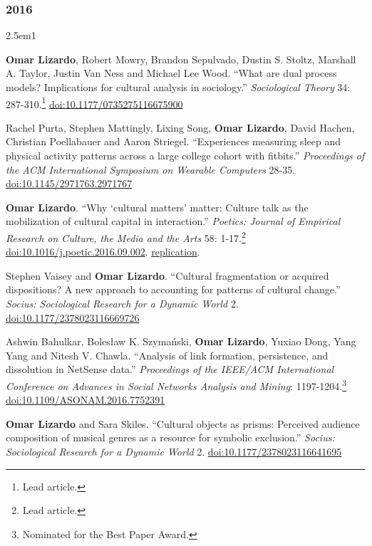 \documentclass[
]{article}
\newenvironment{cventry}{\begin{hangparas}{2.5em}{1}}{\end{hangparas}}
\begin{document}
\subsubsection{2016}\label{section-6}

\begin{cventry}

\textbf{Omar Lizardo}, Robert Mowry, Brandon Sepulvado, Dustin S.
Stoltz, Marshall A. Taylor, Justin Van Ness and Michael Lee Wood. ``What
are dual process models? Implications for cultural analysis in
sociology.'' \emph{Sociological Theory} 34: 287-310.\footnote{Lead
  article.}
\href{https://doi.org/10.1177/0735275116675900}{doi:10.1177/0735275116675900}

Rachel Purta, Stephen Mattingly, Lixing Song, \textbf{Omar Lizardo},
David Hachen, Christian Poellabauer and Aaron Striegel. ``Experiences
measuring sleep and physical activity patterns across a large college
cohort with fitbits.'' \emph{Proceedings of the ACM International
Symposium on Wearable Computers} 28-35.
\href{https://doi.org/10.1145/2971763.2971767}{doi:10.1145/2971763.2971767}

\textbf{Omar Lizardo}. ``Why `cultural matters' matter: Culture talk as
the mobilization of cultural capital in interaction.'' \emph{Poetics:
Journal of Empirical Research on Culture, the Media and the Arts} 58:
1-17.\footnote{Lead article.}
\href{https://doi.org/10.1016/j.poetic.2016.09.002}{doi:10.1016/j.poetic.2016.09.002}.
\href{https://github.com/olizardo/lizardo-culture-talk-stratification}{
replication}.

Stephen Vaisey and \textbf{Omar Lizardo}. ``Cultural fragmentation or
acquired dispositions? A new approach to accounting for patterns of
cultural change.'' \emph{Socius: Sociological Research for a Dynamic
World} 2.
\href{https://doi.org/10.1177/2378023116669726}{doi:10.1177/2378023116669726}

Ashwin Bahulkar, Bolesław K. Szymański, \textbf{Omar Lizardo}, Yuxiao
Dong, Yang Yang and Nitesh V. Chawla. ``Analysis of link formation,
persistence, and dissolution in NetSense data.'' \emph{Proceedings of
the IEEE/ACM International Conference on Advances in Social Networks
Analysis and Mining}: 1197-1204.\footnote{Nominated for the Best Paper
  Award.}
\href{https://doi.org/10.1109/ASONAM.2016.7752391}{doi:10.1109/ASONAM.2016.7752391}

\textbf{Omar Lizardo} and Sara Skiles. ``Cultural objects as prisms:
Perceived audience composition of musical genres as a resource for
symbolic exclusion.'' \emph{Socius: Sociological Research for a Dynamic
World} 2.
\href{https://doi.org/10.1177/2378023116641695}{doi:10.1177/2378023116641695}


\end{cventry}
\end{document}
